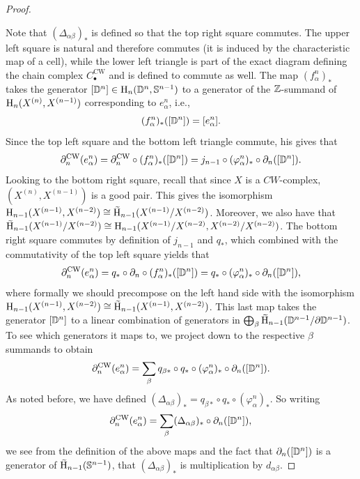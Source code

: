 \begin{proof}
\begin{enumerate}
    \end{enumerate}
    Note that $(\Delta_{\alpha\beta})_\ast$ is defined so that the top right square commutes. The upper left square is natural and therefore commutes (it is induced by the characteristic map of a cell), while the lower left triangle is part of the exact diagram defining the chain complex $C_\bullet^{\mathrm{CW}}$ and is defined to commute as well. The map $(f_\alpha^n)_\ast$ takes the generator $[\mathbb{D}^n]\in \mathrm{H}_n(\mathbb{D}^n,\mathbb{S}^{n-1})$ to a generator of the $\mathbb{Z}$-summand of $\mathrm{H}_n(X^{(n)},X^{(n-1)})$ corresponding to $e^n_\alpha$, i.e., 
    \[(f^n_\alpha)_\ast([\mathbb{D}^n])=[e^n_\alpha].\]
    Since the top left square and the bottom left triangle commute, his gives that 
    \[\partial_n^{\mathrm{CW}}(e^n_\alpha)=\partial_n^{\mathrm{CW}}\circ (f^n_\alpha)_\ast([\mathbb{D}^n])=j_{n-1}\circ (\varphi_\alpha^n)_\ast\circ \partial_n([\mathbb{D}^n]).\]
    Looking to the bottom right square, recall that since $X$ is a $CW$-complex, $(X^{(n)},X^{(n-1)})$ is a good pair. This gives the isomorphism $\rmH_{n-1}(X^{(n-1)},X^{(n-2)})\cong \wt{\rmH}_{n-1}(X^{(n-1)}\slash X^{(n-2)})$. Moreover, we also have that $\wt{\rmH}_{n-1}(X^{(n-1)}\slash X^{(n-2)})\cong \rmH_{n-1}(X^{(n-1)}\slash X^{(n-2)},X^{(n-2)}\slash\allowbreak X^{(n-2)})$. The bottom right square commutes by definition of $j_{n-1}$ and $q_\ast$, which combined with the commutativity of the top left square yields that
    \[\partial_n^{\mathrm{CW}}(e^n_\alpha)=q_\ast\circ \partial_n\circ (f_\alpha^n)_\ast([\mathbb{D}^n])=q_\ast\circ (\varphi^n_\alpha)_\ast\circ \partial_n([\mathbb{D}^n]),\]
    where formally we should precompose on the left hand side with the isomorphism $\rmH_{n-1}(X^{(n-1)},\allowbreak X^{(n-2)})\cong \wt{\rmH}_{n-1}(X^{(n-1)},X^{(n-2)})$. This last map takes the generator $[\mathbb{D}^n]$ to a linear combination of generators in $\bigoplus_\beta \wt{\rmH}_{n-1}(\bbD^{n-1}\slash \partial \bbD^{n-1})$. To see which generators it maps to, we project down to the respective $\beta$ summands to obtain
    \[\partial_n^{\mathrm{CW}}(e^n_\alpha)=\sum_\beta q_{\beta\ast}\circ q_\ast\circ (\varphi^n_\alpha)_\ast\circ \partial_n([\mathbb{D}^n]).\]
    As noted before, we have defined $(\Delta_{\alpha\beta})_\ast=q_{\beta\ast}\circ q_\ast\circ (\varphi^n_\alpha)_\ast$. So writing
    \[\partial_n^{\mathrm{CW}}(e^n_\alpha)=\sum_\beta (\Delta_{\alpha\beta})_\ast \circ \partial_n([\mathbb{D}^n]),\]
    we see from the definition of the above maps and the fact that $\partial_n([\mathbb{D}^n])$ is a generator of $\wt{\rmH}_{n-1}(\bbS^{n-1})$, that $(\Delta_{\alpha\beta})_\ast$ is multiplication by $d_{\alpha\beta}$.
\end{proof}


